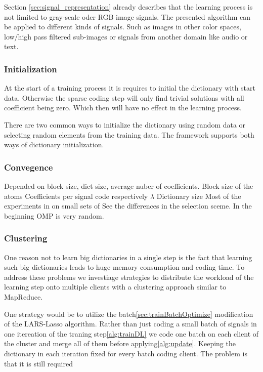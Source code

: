 Section \ref{sec:signal_representation} already describes that the learning
process is not limited to gray-scale oder RGB image signals. The presented
algorithm can be applied to different kinds of signals. Such as images in other
color spaces, low/high pass filtered sub-images or signals from another domain
like audio or text. 


\subsubsection{Initialization}
At the start of a training process it is requires to initial the
dictionary with start data. Otherwise the sparse coding step will only find
trivial solutions with all coefficient being zero. Which then will have no
effect in the learning process.

There are two common ways to initialize the dictionary using random data or
selecting random elements from the training data. The framework supports 
both ways of dictionary initialization. 

\subsubsection{Convegence}

Depended on block size, dict size, average nuber of coefficients.
Block size of the atoms
Coefficients per signal code respectively $\lambda$
Dictionary size 
Most of the experiments in on small sets of 
See the differences in the selection sceme.
In the beginning OMP is very random.


\subsubsection{Clustering}
One reason not to learn big dictionaries in a single step is the fact that
learning such big dictionaries leads to huge memory consumption and coding time.
To address these problems we investiage strategies to distribute the workload of
the learning step onto multiple clients with a clustering approach similar to
MapReduce. 

One strategy would be to utilize the batch\ref{sec:trainBatchOptimize}
modification of the LARS-Lasso algorithm. Rather than just coding a small batch
of signals in one itereation of the traning step\ref{alg:trainDL} we code one
batch on each client of the cluster and merge all of them before
applying\ref{alg:update}. Keeping the dictionary in each iteration fixed
for every batch coding client. The problem is that it is still required 

